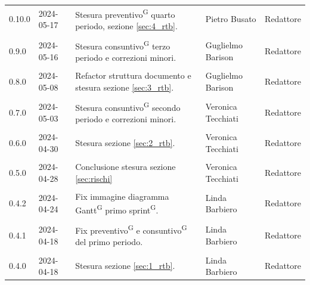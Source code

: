 \documentclass[8pt]{article}
\newcommand{\glossterm}[1]{#1\textsuperscript{G}} %
\begin{document}
\begin{table}[ht!]
\begin{tabular}{p{1.2cm} p{2cm} p{6cm} p{3cm} p{2cm}}
        0.10.0 & 2024-05-17 & Stesura \glossterm{preventivo} quarto periodo, sezione \ref{sec:4_rtb}. & Pietro Busato & Redattore \\\\
		0.9.0 & 2024-05-16 & Stesura \glossterm{consuntivo} terzo periodo e correzioni minori. & Guglielmo Barison & Redattore \\\\
        0.8.0 & 2024-05-08 & Refactor struttura documento e stesura sezione \ref{sec:3_rtb}. & Guglielmo Barison & Redattore \\\\
        0.7.0 & 2024-05-03 & Stesura \glossterm{consuntivo} secondo periodo e correzioni minori. & Veronica Tecchiati & Redattore \\\\
        0.6.0 & 2024-04-30 & Stesura sezione \ref{sec:2_rtb}. & Veronica Tecchiati & Redattore \\\\
        0.5.0 & 2024-04-28 & Conclusione stesura sezione \ref{sec:rischi} & Veronica Tecchiati & Redattore \\\\
		0.4.2 & 2024-04-24 & Fix immagine diagramma \glossterm{Gantt} primo \glossterm{sprint}. & Linda Barbiero & Redattore \\\\
		0.4.1 & 2024-04-18 & Fix \glossterm{preventivo} e \glossterm{consuntivo} del primo periodo. & Linda Barbiero & Redattore \\\\
		0.4.0 & 2024-04-18 & Stesura sezione \ref{sec:1_rtb}. & Linda Barbiero & Redattore \\
		\bottomrule
\end{tabular}
\newpage
\clearpage
\end{table}
\end{document}
